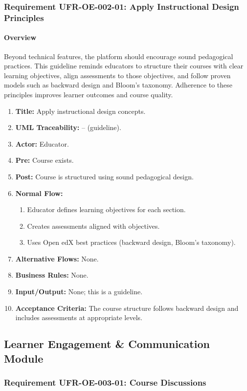 \subsubsection{Requirement UFR-OE-002-01: Apply Instructional Design Principles}
\paragraph{Overview}
Beyond technical features, the platform should encourage sound pedagogical practices. This guideline reminds educators to structure their courses with clear learning objectives, align assessments to those objectives, and follow proven models such as backward design and Bloom’s taxonomy. Adherence to these principles improves learner outcomes and course quality.
\begin{enumerate}[label=\textbf{\arabic*.}]
\item \textbf{Title:} Apply instructional design concepts.
\item \textbf{UML Traceability:} – (guideline).
\item \textbf{Actor:} Educator.
\item \textbf{Pre:} Course exists.
\item \textbf{Post:} Course is structured using sound pedagogical design.
\item \textbf{Normal Flow:} 
    \begin{enumerate}
        \item Educator defines learning objectives for each section.
        \item Creates assessments aligned with objectives.
        \item Uses Open edX best practices (backward design, Bloom's taxonomy).
    \end{enumerate}
\item \textbf{Alternative Flows:} None.
\item \textbf{Business Rules:} None.
\item \textbf{Input/Output:} None; this is a guideline.
\item \textbf{Acceptance Criteria:} The course structure follows backward design and includes assessments at appropriate levels.
\end{enumerate}

\subsection{Learner Engagement \& Communication Module}
\subsubsection{Requirement UFR-OE-003-01: Course Discussions}
